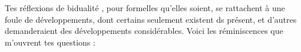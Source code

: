 
 Tes réflexions de bidualité , pour formelles qu'elles soient, se rattachent à une foule de développements, dont certains seulement existent\unsure{,} ds  présent, et d'autres demanderaient des développements considérables. Voici les réminiscences que m'ouvrent tes  questions :

